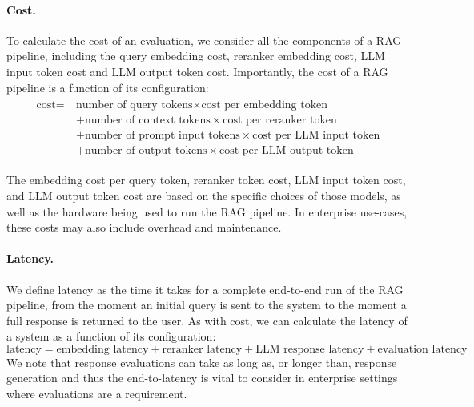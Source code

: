 \paragraph{Cost.} To calculate the cost of an evaluation, we consider all the components of a RAG pipeline, including the query embedding cost, reranker embedding cost, LLM input token cost and LLM output token cost. Importantly, the cost of a RAG pipeline is a function of its configuration:
\begin{align}
\begin{split}
    \text{cost} = ~&\text{number of query tokens} \times \text{cost per embedding token} \\
    &+\text{number of context tokens} \times \text{cost per reranker token} \\
    &+ \text{number of prompt input tokens} \times \text{cost per LLM input token} \\
    &+ \text{number of output tokens} \times \text{cost per LLM output token}
\end{split}
\end{align}

The embedding cost per query token, reranker token cost, LLM input token cost, and LLM output token cost are based on the specific choices of those models, as well as the hardware being used to run the RAG pipeline. In enterprise use-cases, these costs may also include overhead and maintenance.

\paragraph{Latency.} We define latency as the time it takes for a complete end-to-end run of the RAG pipeline, from the moment an initial query is sent to the system to the moment a full response is returned to the user. As with cost, we can calculate the latency of a system as a function of its configuration:
\begin{equation}
    \text{latency} = \text{embedding latency} + \text{reranker latency} + \text{LLM response latency} + \text{evaluation latency}
\end{equation}
We note that response evaluations can take as long as, or longer than, response generation and thus the end-to-latency is vital to consider in enterprise settings where evaluations are a requirement.